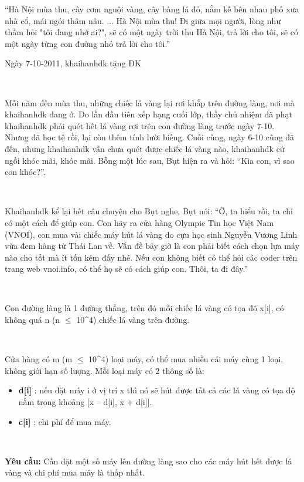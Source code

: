 “Hà Nội mùa thu, cây cơm nguội vàng, cây bàng lá đỏ, nằm kề bên nhau phố xưa nhà cổ, mái ngói thâm nâu. ... Hà Nội mùa thu! Đi giữa mọi người, lòng như thầm hỏi "tôi đang nhớ ai?", sẽ có một ngày trời thu Hà Nội, trả lời cho tôi, sẽ có một ngày từng con đường nhỏ trả lời cho tôi.”

Ngày 7-10-2011, khaihanhdk tặng ĐK

 

Mỗi năm đến mùa thu, những chiếc lá vàng lại rơi khắp trên đường làng, nơi mà khaihanhdk đang ở. Do lần đầu tiên xếp hạng cuối lớp, thầy chủ nhiệm đã phạt khaihanhdk phải quét hết lá vàng rơi trên con đường làng trước ngày 7-10. Nhưng đã học tệ rồi, lại còn thêm tính lười biếng. Cuối cùng, ngày 6-10 cũng đã đến, nhưng khaihanhdk vẫn chưa quét được chiếc lá vàng nào, khaihanhdk cứ ngồi khóc mãi, khóc mãi. Bỗng một lúc sau, Bụt hiện ra và hỏi: “Kìa con, vì sao con khóc?”.

 

Khaihanhdk kể lại hết câu chuyện cho Bụt nghe, Bụt nói: “Ờ, ta hiểu rồi, ta chỉ có một cách để giúp con. Con hãy ra cửa hàng Olympic Tin học Việt Nam (VNOI), con mua vài chiếc máy hút lá vàng do cựu học sinh Nguyễn Vương Linh vừa đem hàng từ Thái Lan về. Vấn đề bây giờ là con phải biết cách chọn lựa máy nào cho tốt mà ít tốn kém đấy nhé. Nếu con không biết có thể hỏi các coder trên trang web vnoi.info, có thể họ sẽ có cách giúp con. Thôi, ta đi đây.”

 

Con đường làng là 1 đường thẳng, trên đó mỗi chiếc lá vàng có tọa độ x[i], có không quá n (n  $\le$  10^4) chiếc lá vàng trên đường.

 

Cửa hàng có m (m  $\le$  10^4) loại máy, có thể mua nhiều cái máy cùng 1 loại, không giới hạn số lượng. Mỗi loại máy có 2 thông số là:
\begin{itemize}
	\item \textbf{d[i] } : nếu đặt máy i ở vị trí x thì nó sẽ hút được tất cả các lá vàng có tọa độ nằm trong khoảng [x – d[i], x + d[i]].
	\item \textbf{c[i] } : chi phí để mua máy.
\end{itemize}

 

\textbf{Yêu cầu: } Cần đặt một số máy lên đường làng sao cho các máy hút hết được lá vàng và chi phí mua máy là thấp nhất.